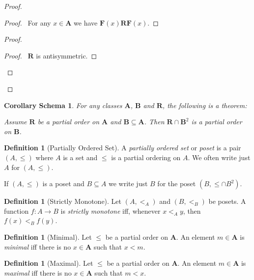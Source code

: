 \documentclass{book}
\let\qed\relax
\newtheorem{cors}{Corollary Schema}[ax]
\theoremstyle{definition}
\newtheorem{df}[ax]{Definition}
\begin{document}
\begin{proof}
\pf
{}
\begin{proof}
	\pf\ For any $x \in \mathbf{A}$ we have $\mathbf{F}(x) \mathbf{R} \mathbf{F}(x)$.
\end{proof}
\begin{proof}
	\begin{proof}
		\pf\ $\mathbf{R}$ is antisymmetric.
	\end{proof}
\end{proof}
\qed
\end{proof}

\begin{cors}
\label{cor:subposet}
For any classes $\mathbf{A}$, $\mathbf{B}$ and $\mathbf{R}$, the following is a theorem:

Assume $\mathbf{R}$ be a partial order on $\mathbf{A}$ and $\mathbf{B} \subseteq \mathbf{A}$. Then $\mathbf{R} \cap \mathbf{B}^2$ is a partial order on $\mathbf{B}$.
\end{cors}

\begin{df}[Partially Ordered Set]
A \emph{partially ordered set} or \emph{poset} is a pair $(A, \leq)$ where $A$ is a set and $\leq$ is a partial ordering on $A$. We often write just $A$ for $(A, \leq)$.

If $(A, \leq)$ is a poset and $B \subseteq A$ we write just $B$ for the poset $(B, \leq \cap B^2)$.
\end{df}

\begin{df}[Strictly Monotone]
Let $(A,<_A)$ and $(B, <_B)$ be posets. A function $f : A \rightarrow B$ is \emph{strictly monotone} iff, whenever $x <_A y$, then $f(x) <_B f(y)$.
\end{df}

\begin{df}[Minimal]
Let $\leq$ be a partial order on $\mathbf{A}$. An element $m \in \mathbf{A}$ is \emph{minimal} iff there is no $x \in \mathbf{A}$ such that $x < m$.
\end{df}

\begin{df}[Maximal]
Let $\leq$ be a partial order on $\mathbf{A}$. An element $m \in \mathbf{A}$ is \emph{maximal} iff there is no $x \in \mathbf{A}$ such that $m < x$.
\end{df}
\end{document}
